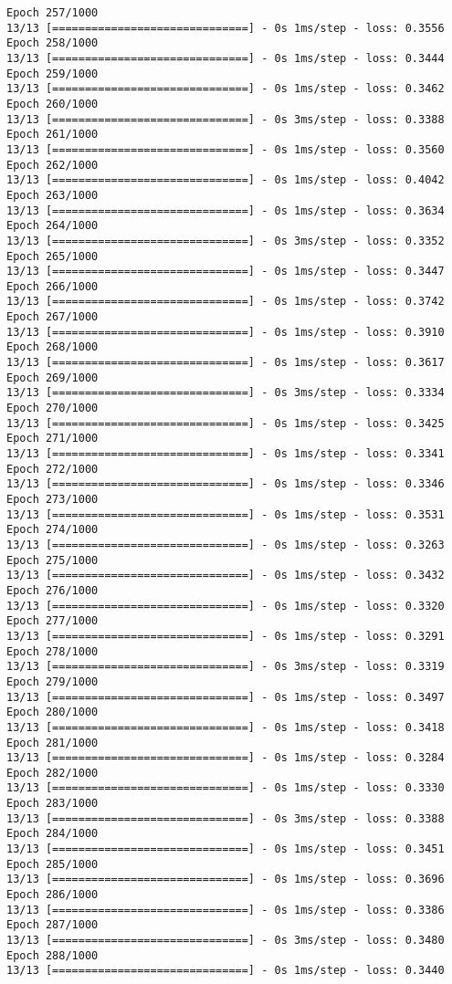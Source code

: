 \documentclass[11pt]{article}
\begin{document}
\begin{Verbatim}[commandchars=\\\{\}]
Epoch 257/1000
13/13 [==============================] - 0s 1ms/step - loss: 0.3556
Epoch 258/1000
13/13 [==============================] - 0s 1ms/step - loss: 0.3444
Epoch 259/1000
13/13 [==============================] - 0s 1ms/step - loss: 0.3462
Epoch 260/1000
13/13 [==============================] - 0s 3ms/step - loss: 0.3388
Epoch 261/1000
13/13 [==============================] - 0s 1ms/step - loss: 0.3560
Epoch 262/1000
13/13 [==============================] - 0s 1ms/step - loss: 0.4042
Epoch 263/1000
13/13 [==============================] - 0s 1ms/step - loss: 0.3634
Epoch 264/1000
13/13 [==============================] - 0s 3ms/step - loss: 0.3352
Epoch 265/1000
13/13 [==============================] - 0s 1ms/step - loss: 0.3447
Epoch 266/1000
13/13 [==============================] - 0s 1ms/step - loss: 0.3742
Epoch 267/1000
13/13 [==============================] - 0s 1ms/step - loss: 0.3910
Epoch 268/1000
13/13 [==============================] - 0s 1ms/step - loss: 0.3617
Epoch 269/1000
13/13 [==============================] - 0s 3ms/step - loss: 0.3334
Epoch 270/1000
13/13 [==============================] - 0s 1ms/step - loss: 0.3425
Epoch 271/1000
13/13 [==============================] - 0s 1ms/step - loss: 0.3341
Epoch 272/1000
13/13 [==============================] - 0s 1ms/step - loss: 0.3346
Epoch 273/1000
13/13 [==============================] - 0s 1ms/step - loss: 0.3531
Epoch 274/1000
13/13 [==============================] - 0s 1ms/step - loss: 0.3263
Epoch 275/1000
13/13 [==============================] - 0s 1ms/step - loss: 0.3432
Epoch 276/1000
13/13 [==============================] - 0s 1ms/step - loss: 0.3320
Epoch 277/1000
13/13 [==============================] - 0s 1ms/step - loss: 0.3291
Epoch 278/1000
13/13 [==============================] - 0s 3ms/step - loss: 0.3319
Epoch 279/1000
13/13 [==============================] - 0s 1ms/step - loss: 0.3497
Epoch 280/1000
13/13 [==============================] - 0s 1ms/step - loss: 0.3418
Epoch 281/1000
13/13 [==============================] - 0s 1ms/step - loss: 0.3284
Epoch 282/1000
13/13 [==============================] - 0s 1ms/step - loss: 0.3330
Epoch 283/1000
13/13 [==============================] - 0s 3ms/step - loss: 0.3388
Epoch 284/1000
13/13 [==============================] - 0s 1ms/step - loss: 0.3451
Epoch 285/1000
13/13 [==============================] - 0s 1ms/step - loss: 0.3696
Epoch 286/1000
13/13 [==============================] - 0s 1ms/step - loss: 0.3386
Epoch 287/1000
13/13 [==============================] - 0s 3ms/step - loss: 0.3480
Epoch 288/1000
13/13 [==============================] - 0s 1ms/step - loss: 0.3440

\end{Verbatim}
\end{document}
